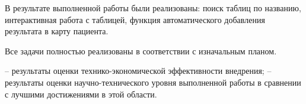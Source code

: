 \conclusion

В результате выполненной работы были реализованы: поиск таблиц по названию, интерактивная работа с таблицей, функция автоматического добавления результата в карту пациента.

Все задачи полностью реализованы в соответствии с изначальным планом.


– результаты оценки технико-экономической эффективности внедрения;  
– результаты оценки научно-технического уровня выполненной работы в сравнении с лучшими достижениями в этой области.

